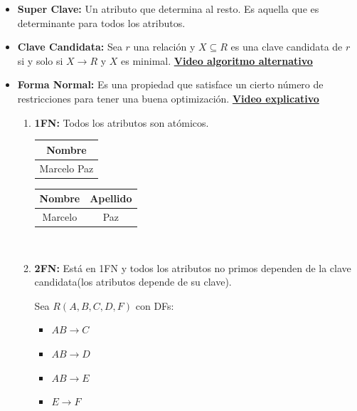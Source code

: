 \documentclass{templateNote}
\begin{document}
\begin{itemize}
    \newpage
    \item \textbf{Super Clave:} Un atributo que determina al resto. Es aquella que es determinante para todos los atributos.

    \item \textbf{Clave Candidata:} Sea $r$ una relación y $X \subseteq R$ es una clave candidata de $r$ si y solo si $X \rightarrow R$ y $X$ es minimal.
    \textbf{\href{https://www.youtube.com/watch?v=MRD35wGmsUg}{Video algoritmo alternativo}}

    \item \textbf{Forma Normal:} Es una propiedad que satisface un cierto número de restricciones para tener una buena optimización.
    \textbf{\href{https://www.youtube.com/playlist?list=PLE19WVM4rff1ion43QTNdbbejTKNhYs8x}{Video explicativo}}
    
    \begin{enumerate}
        \item \textbf{1FN:} Todos los atributos son atómicos.
        \\

        \begin{minipage}{0.5\textwidth}
            \begin{tabular}{|c|}
                \hline
                \textbf{Nombre}\\ \hline
                \rowcolor{red!20!white} Marcelo Paz \\ \hline
            \end{tabular}
        \end{minipage}
        \hfill
        \begin{minipage}{0.5\textwidth}
            \begin{tabular}{|c|c|}
                \hline
                \textbf{Nombre} & \textbf{Apellido}\\ \hline
                \rowcolor{green!20!white} Marcelo & Paz \\ \hline
            \end{tabular}
        \end{minipage}
        \\
        
        \item \textbf{2FN:} Está en 1FN y todos los atributos no primos dependen de la clave candidata(los atributos depende de su clave).
        
        Sea $R(A,B,C,D,F)$ con DFs:
        \begin{itemize}
            \item $AB \rightarrow C$
            \item $AB \rightarrow D$
            \item $AB \rightarrow E$
            \item $E \rightarrow F$
        \end{itemize}


\end{enumerate}
\end{itemize}
\end{document}
